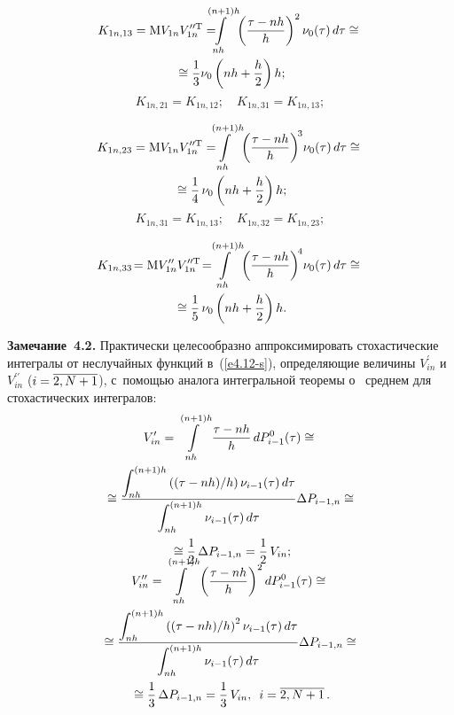 \begin{multicols}{2}
 \vspace*{-12pt}
 
 \noindent
 \begin{multline*}
K_{1n,13}=\mathrm{M} V_{1n}V^{\prime\prime\mathrm{T}}_{1n}=\!\!\!\!\!\!\!\inh\! \left(\ovth\right)^2 
\nu_0(\tau)\,d\tau
    \cong{}\\
    {}\cong \fr{1}{3}\nu_0\left(nh+\fr{h}{2}\right)h;
    \end{multline*}
    $$ 
    K_{1n,21}= K_{1n,12};\quad K_{1n,31}= K_{1n,13};
    $$
    
   \vspace*{-12pt}
 
 \noindent
 \begin{multline*}
    K_{1n,23}=\mathrm{M} V_{1n}V^{\prime\prime\mathrm{T}}_{1n}=\!\!\!\!\!\inh \!\left(\ovth\right)^{\!3}\! 
\nu_0(\tau)\,d\tau     \cong{}\\
{}\cong \fr{1}{4}\,\nu_0\left(nh+\fr{h}{2}\right)h;
\end{multline*}
    $$
     K_{1n,31}= K_{1n,13};\quad K_{1n,32}= K_{1n,23};
     $$
     
   \vspace*{-12pt}
 
 \noindent
 \begin{multline*}
    K_{1n,33}\!=\mathrm{M} V_{1n}^{\prime\prime} V^{\prime\prime\mathrm{T}}_{1n}\!=\!\!\!\inh\! \left(\ovth\right)^{\!4}\!
    \nu_0(\tau)\,d\tau\cong{}\\
    {}\cong \fr{1}{5}\,\nu_0\left(nh+\fr{h}{2}\right)h.
    \end{multline*}


\noindent
\textbf{Замечание~4.2.}
Практически целесообразно аппроксимировать
стохастические интегралы от неслучайных
функций в~(\ref{e4.12-s}), определяющие величины $V_{in}^\prime$ и~$V_{in}^{\prime\prime}$
($i\hm=\overline{2,N+1}$), с~помощью аналога интегральной теоремы о~ среднем
для стохастических интегралов:
 \begin{multline*}
 V_{{in}}'=\int\limits_{nh}^{(n+1)h} {\displaystyle\frac{\displaystyle \tau-nh\mathstrut}{\displaystyle h\mathstrut}} \,dP_{i-1}^0(\tau)\cong{}\\
 {}\cong \displaystyle\frac{\displaystyle \int\nolimits_{nh}^{(n+1)h} \left(
    (\tau- nh)/h\right) \nu_{i-1}(\tau)\,d\tau\mathstrut}{\displaystyle \int\nolimits_{nh}^{(n+1)h} \nu_{i-1}(\tau)\,d\tau\mathstrut}
    \Delta P_{i-1,n}\cong{}\\
    {}\cong \displaystyle\frac{\displaystyle 1\mathstrut}{\displaystyle 2\mathstrut}\,\Delta P_{i-1,n}=
    \displaystyle\frac{\displaystyle 1\mathstrut}{\displaystyle 2\mathstrut}\,V_{{in}};\\[-20pt]
    \end{multline*}
    


\noindent
\begin{multline*}
   V_{{in}}''=\int\limits_{nh}^{(n+1)h} \left( {\displaystyle\frac{\displaystyle \tau-nh\mathstrut}{\displaystyle h\mathstrut}}\right)^2 dP_{i-1}^0(\tau)
    \cong{}\\
    {}\cong \displaystyle\frac{\displaystyle \int\nolimits_{nh}^{(n+1)h} \left( (\tau-nh)/h\right)^2 \nu_{i-1}(\tau)\,d\tau\mathstrut}{\displaystyle \int\nolimits_{nh}^{(n+1)h} 
\nu_{i-1}(\tau)\,d\tau\mathstrut}\Delta P_{i-1,n}\cong{}\\
{}\cong \displaystyle\frac{\displaystyle 1\mathstrut}{\displaystyle 3\mathstrut}\,\Delta P_{i-1,n}=
    \displaystyle\frac{\displaystyle 1\mathstrut}{\displaystyle 3\mathstrut}\,V_{{in}},\enskip i=\overline{2,N+1}\,.
    \end{multline*}



\end{multicols}

